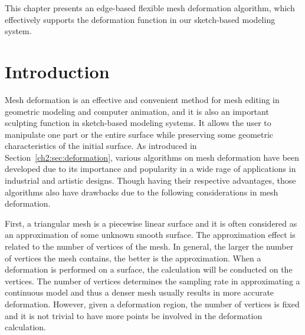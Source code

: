 This chapter presents an edge-based flexible mesh deformation
algorithm, which effectively supports the deformation function in
our sketch-based modeling system.

\section{Introduction}
\label{ch5:sec:intro}
Mesh deformation is an effective and convenient  method for mesh
editing in geometric modeling and computer animation, and it is also
an important sculpting function in sketch-based modeling systems. It
allows the user to manipulate one part or the entire surface while
preserving some geometric characteristics of the initial surface. As
 introduced in Section~\ref{ch2:sec:deformation}, various
algorithms on mesh deformation have been developed due to its
importance and popularity in a wide rage of applications in
industrial and artistic designs. Though having their respective
advantages, those algorithms also have drawbacks due to the
following considerations in mesh deformation.

First, a triangular mesh is a piecewise linear  surface and it is
often considered as an approximation of some unknown smooth surface.
The approximation effect is related to the number of vertices of the
mesh. In general, the larger the number of vertices the mesh
contains, the better is the approximation. When a deformation is
performed on a surface, the calculation will be conducted on the
vertices. The number of vertices determines the sampling rate in
approximating a continuous model and thus a denser mesh usually
results in more accurate deformation. However, given a deformation
region, the number of vertices is fixed and it is not trivial to
have more points be involved in the deformation calculation.

